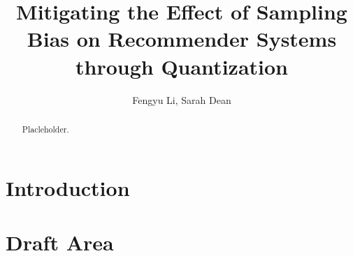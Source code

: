 \documentclass[12pt, letterpaper]{article}
\title{\vspace{-2.0cm}Mitigating the Effect of Sampling Bias on Recommender Systems through Quantization}
\author{Fengyu Li, Sarah Dean}
\date{}
\theoremstyle{definition}\newtheorem*{definition}{Definition}
\theoremstyle{definition}\newtheorem*{example}{Example}
\theoremstyle{definition}\newtheorem*{remark}{Remark}
\begin{document}
\maketitle

\begin{abstract}
    Placleholder.
\end{abstract}

\section{Introduction}

\section{Draft Area}
\end{document}
